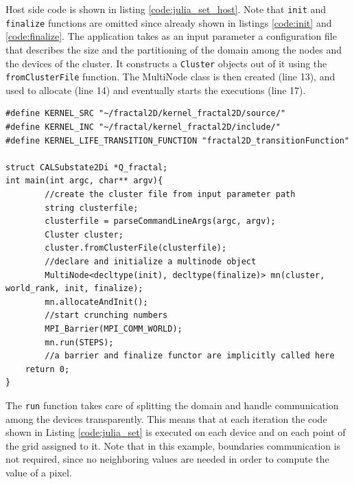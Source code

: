 Host side code is shown in listing \ref{code:julia_set_host}. Note that \texttt{init} and \texttt{finalize} functions are omitted since already shown in listings \ref{code:init} and \ref{code:finalize}.
The application takes as an input parameter a configuration file that describes the size and the partitioning of the domain among the nodes and the devices of the cluster. It constructs a \texttt{Cluster} objects out of it using the \texttt{fromClusterFile} function.
The MultiNode class is then created (line 13), and used to allocate  (line 14) and eventually starts the executions (line 17).
\begin{lstlisting}
#define KERNEL_SRC "~/fractal2D/kernel_fractal2D/source/"
#define KERNEL_INC "~/fractal/kernel_fractal2D/include/"
#define KERNEL_LIFE_TRANSITION_FUNCTION "fractal2D_transitionFunction"

struct CALSubstate2Di *Q_fractal; 
int main(int argc, char** argv){
        //create the cluster file from input parameter path
        string clusterfile;
        clusterfile = parseCommandLineArgs(argc, argv);
        Cluster cluster;
        cluster.fromClusterFile(clusterfile);
        //declare and initialize a multinode object
        MultiNode<decltype(init), decltype(finalize)> mn(cluster, world_rank, init, finalize);
        mn.allocateAndInit();
        //start crunching numbers
        MPI_Barrier(MPI_COMM_WORLD);
        mn.run(STEPS);
        //a barrier and finalize functor are implicitly called here
    return 0;
}

\end{lstlisting}
The \texttt{run} function takes care of splitting the domain and handle communication among the devices transparently. This means that at each iteration the code shown in Listing \ref{code:julia_set} is executed on each device and on each point of the grid assigned to it. Note that in this example, boundaries communication is not required, since no neighboring values are needed in order to compute the value of a pixel.

